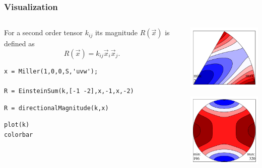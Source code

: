 \begin{frame}[fragile]
  \frametitle{Visualization}

  \begin{columns}
    \begin{column}{8.3cm}

      For a second order tensor $k_{ij}$ its magnitude $R(\vec x)$ is defined as
      \begin{equation*}
        R(\vec x) = k_{ij} \vec x_{i} \vec x_{j}.
      \end{equation*}

\pause
\medskip

\begin{lstlisting}
x = Miller(1,0,0,S,'uvw');

R = EinsteinSum(k,[-1 -2],x,-1,x,-2)
\end{lstlisting}

\pause
\medskip


\begin{lstlisting}
R = directionalMagnitude(k,x)
\end{lstlisting}


\pause
\medskip

  \begin{lstlisting}
plot(k)
colorbar
  \end{lstlisting}

    \end{column}
    \begin{column}{4cm}
      \includegraphics[width=4cm]{pic/tensor1}

      \includegraphics[width=4cm]{pic/tensor}
    \end{column}

  \end{columns}

\end{frame}



